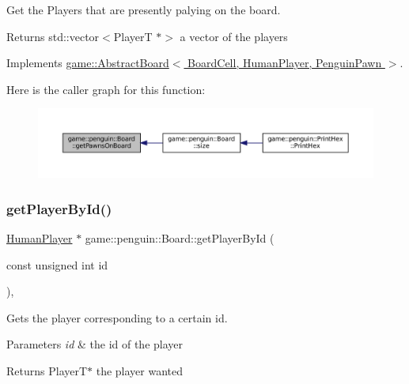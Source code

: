 Get the Players that are presently palying on the board. 

\begin{DoxyReturn}{Returns}
std\+::vector$<$\+Player\+T $\ast$$>$ a vector of the players 
\end{DoxyReturn}


Implements \hyperlink{classgame_1_1_abstract_board_a9c8a033b23ade01ecce24e95723ffd35}{game\+::\+Abstract\+Board$<$ Board\+Cell, Human\+Player, Penguin\+Pawn $>$}.

Here is the caller graph for this function\+:
\nopagebreak
\begin{figure}[H]
\begin{center}
\leavevmode
\includegraphics[width=350pt]{classgame_1_1penguin_1_1_board_a13a38d7c935dd363d7ec9394488539ee_icgraph}
\end{center}
\end{figure}
\mbox{\label{classgame_1_1penguin_1_1_board_a8728b4381bc2e007710d275bb226cf95}} 
\subsubsection{\texorpdfstring{get\+Player\+By\+Id()}{getPlayerById()}}
{\footnotesize\ttfamily \hyperlink{classgame_1_1penguin_1_1_human_player}{Human\+Player} $\ast$ game\+::penguin\+::\+Board\+::get\+Player\+By\+Id (\begin{DoxyParamCaption}\item[{const unsigned int}]{id }\end{DoxyParamCaption})\hspace{0.3cm}{\ttfamily [override]}, {\ttfamily [virtual]}}



Gets the player corresponding to a certain id. 


\begin{DoxyParams}{Parameters}
{\em id} & the id of the player \\
\hline
\end{DoxyParams}
\begin{DoxyReturn}{Returns}
Player\+T$\ast$ the player wanted 
\end{DoxyReturn}


